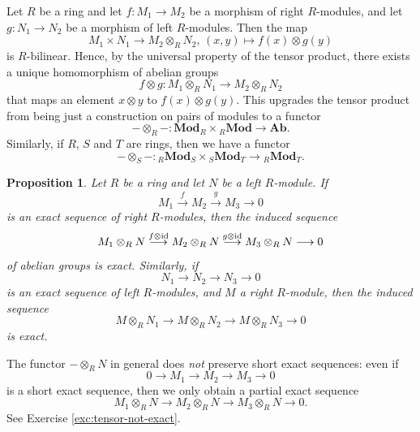 \documentclass[11pt]{amsbook}
\newcommand{\longto}{\longrightarrow}
\DeclareMathOperator\Mod{{\bf{Mod}}}
\def\id{{\rm id}}
\def\Ab{\mathbf{Ab}}
\def\Mod{\mathbf{Mod}}
\theoremstyle{plain}
\newtheorem{proposition}[theorem]{Proposition}
\theoremstyle{definition}
\begin{document}
Let $R$ be a ring and let $f\colon M_1\to M_2$ be a morphism of right $R$-modules, and let $g\colon N_1\to N_2$ be a morphism of left $R$-modules. Then the map
\[
	M_1\times N_1 \to M_2\otimes_R N_2,\, (x,y) \mapsto f(x)\otimes g(y)
\]
is $R$-bilinear. Hence, by the universal property of the tensor product, there exists a unique homomorphism of abelian groups
\[
	f\otimes g\colon M_1\otimes_R N_1 \to M_2\otimes_R N_2
\]
that maps an element $x\otimes y$ to $f(x)\otimes g(y)$. This upgrades  the tensor product from being just a construction on pairs of modules to a functor
\[
	-\otimes_R-\colon \Mod_R \times {}_R\Mod \to \Ab.
\]
Similarly, if $R$, $S$ and $T$ are rings, then we have a functor
\[
	-\otimes_S- \colon {}_R\Mod_S \times {}_S\Mod_T \to {}_R\Mod_T.
\]
	
\begin{proposition}\label{prop:tensor-right-exact}
Let $R$ be a ring and let $N$ be a left $R$-module. If 
\begin{equation}\label{eq:pre-tensor-right-exact}
	M_1 \overset{f}{\longto} M_2 \overset{g}{\longto} M_3 \longto 0
\end{equation}
is an exact sequence of right $R$-modules, then the induced sequence
\begin{equation}\label{eq:tensor-right-exact}
	M_1\otimes_R N \overset{f\otimes \id}{\longto}
	M_2\otimes_R N \overset{g\otimes \id}{\longto}
	M_3\otimes_R N \longto 0
\end{equation}
of abelian groups is exact. Similarly, if
\[
	N_1 \longto N_2 \longto N_3 \longto 0
\]
is an exact sequence of left $R$-modules, and $M$ a right $R$-module, then the induced sequence
\[
	M \otimes_R N_1 \longto M \otimes_R N_2 \longto M \otimes_R N_3 \longto 0
\]
is exact.
\end{proposition}

The functor $-\otimes_R N$ in general does \emph{not} preserve short exact sequences: even if
\[
	0\to M_1 \to M_2 \to M_3 \to 0
\]
is a short exact sequence, then we only obtain a partial exact sequence
\[
	 M_1\otimes_R N \to M_2\otimes_R N \to M_3\otimes_R N \to 0.
\]
See Exercise \ref{exc:tensor-not-exact}.
\end{document}
